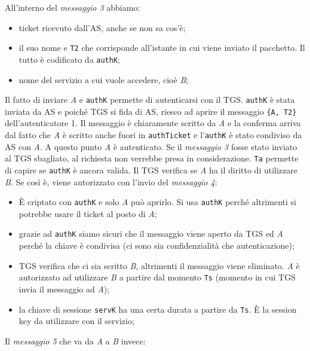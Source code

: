 All'interno del \textit{messaggio 3} abbiamo:

\begin{itemize}
      \item ticket ricevuto dall'AS, anche se non sa cos’è;
      \item il suo nome e \verb|T2| che corrisponde all’istante in cui viene
            inviato il pacchetto. Il tutto è
            codificato da \verb|authK|;
      \item nome del servizio a cui vuole accedere, cioè \textit{B};
\end{itemize}

Il fatto di inviare \textit{A} e \verb|authK| permette di autenticarsi con il TGS.
\verb|authK| è stata inviata da AS e poiché TGS si fida di AS, riesco ad aprire
il messaggio \verb|{A, T2}| dell’autenticatore 1. Il messaggio è chiaramente
scritto da \textit{A} e la conferma arriva dal fatto che \textit{A} è scritto
anche fuori in \verb|authTicket| e l’\verb|authK| è stato condiviso da AS
con \textit{A}. A questo punto \textit{A} è autenticato.
Se il \textit{messaggio 3} fosse stato inviato al TGS sbagliato, al richiesta
non verrebbe presa in considerazione. \verb|Ta| permette di capire se \verb|authK|
è ancora valida.
Il TGS verifica se \textit{A} ha il diritto di utilizzare \textit{B}. Se così è,
viene autorizzato con l’invio del \textit{messaggio 4}:

\begin{itemize}
      \item È criptato con \verb|authK| e solo \textit{A} può aprirlo.
            Si usa \verb|authK| perché altrimenti si potrebbe usare il ticket al
            posto di \textit{A};
      \item grazie ad \verb|authK| siamo sicuri che il messaggio viene aperto
            da TGS ed \textit{A} perché la chiave è condivisa
            (ci sono sia confidenzialità che autenticazione);
      \item TGS verifica che ci sia scritto \textit{B}, altrimenti il messaggio
            viene eliminato. \textit{A} è autorizzato ad utilizzare \textit{B}
            a partire dal momento \verb|Ts|
            (momento in cui TGS invia il messaggio ad \textit{A});
      \item la chiave di sessione \verb|servK| ha una certa durata a partire
            da \verb|Ts|. È la session key da utilizzare con il servizio;
\end{itemize}

Il \textit{messaggio 5} che va da \textit{A} a \textit{B} invece:

